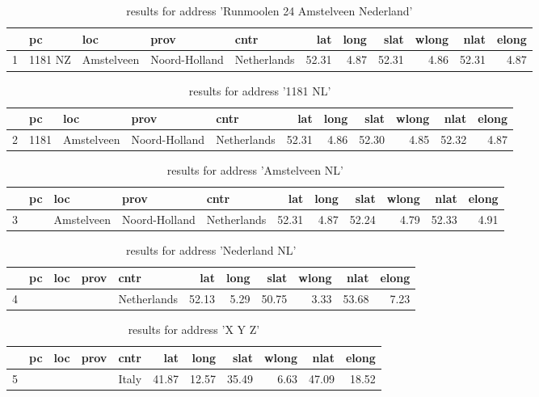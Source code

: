 \documentclass[]{article}
\begin{document}
\begin{table}[!htbp]
\centering
\begin{tabular}{rllllrrrrrr}
  \hline
 & pc & loc & prov & cntr & lat & long & slat & wlong & nlat & elong \\ 
  \hline
1 & 1181 NZ & Amstelveen & Noord-Holland & Netherlands & 52.31 & 4.87 & 52.31 & 4.86 & 52.31 & 4.87 \\ 
   \hline
\end{tabular}
\caption{results for address 'Runmoolen 24 Amstelveen Nederland'\label{table:e1}} 
\end{table}\begin{table}[!htbp]
\centering
\begin{tabular}{rllllrrrrrr}
  \hline
 & pc & loc & prov & cntr & lat & long & slat & wlong & nlat & elong \\ 
  \hline
2 & 1181 & Amstelveen & Noord-Holland & Netherlands & 52.31 & 4.86 & 52.30 & 4.85 & 52.32 & 4.87 \\ 
   \hline
\end{tabular}
\caption{results for address '1181 NL'\label{table:e2}} 
\end{table}\begin{table}[!htbp]
\centering
\begin{tabular}{rllllrrrrrr}
  \hline
 & pc & loc & prov & cntr & lat & long & slat & wlong & nlat & elong \\ 
  \hline
3 &  & Amstelveen & Noord-Holland & Netherlands & 52.31 & 4.87 & 52.24 & 4.79 & 52.33 & 4.91 \\ 
   \hline
\end{tabular}
\caption{results for address 'Amstelveen NL'\label{table:e3}} 
\end{table}\begin{table}[!htbp]
\centering
\begin{tabular}{rllllrrrrrr}
  \hline
 & pc & loc & prov & cntr & lat & long & slat & wlong & nlat & elong \\ 
  \hline
4 &  &  &  & Netherlands & 52.13 & 5.29 & 50.75 & 3.33 & 53.68 & 7.23 \\ 
   \hline
\end{tabular}
\caption{results for address 'Nederland NL'\label{table:e4}} 
\end{table}\begin{table}[!htbp]
\centering
\begin{tabular}{rllllrrrrrr}
  \hline
 & pc & loc & prov & cntr & lat & long & slat & wlong & nlat & elong \\ 
  \hline
5 &  &  &  & Italy & 41.87 & 12.57 & 35.49 & 6.63 & 47.09 & 18.52 \\ 
   \hline
\end{tabular}
\caption{results for address 'X Y Z'\label{table:e5}} 
\end{table}
\end{document}
